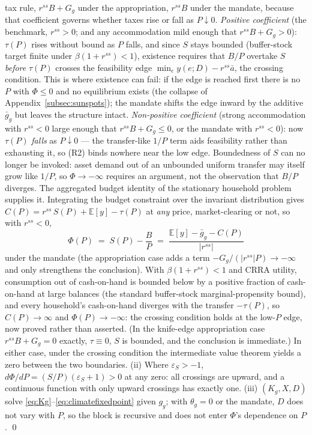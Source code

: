 \documentclass[12pt]{article}
\newcommand{\E}{\mathbb{E}}
\newcommand{\Sfun}{S}
\begin{document}
tax rule, $r^{ss}B+G_g$ under the appropriation, $r^{ss}B$ under the
mandate, because that coefficient governs whether taxes rise or fall as
$P\downarrow0$. \emph{Positive coefficient} (the benchmark, $r^{ss}>0$; and
any accommodation mild enough that $r^{ss}B+G_g>0$): $\tau(P)$ rises without
bound as $P$ falls, and since $\Sfun$ stays bounded (buffer-stock target
finite under $\beta(1+r^{ss})<1$), existence requires that $B/P$ overtake
$\Sfun$ \emph{before} $\tau(P)$ crosses the feasibility edge
$\min_e y(e;D)-r^{ss}\bar a$, the crossing condition. This is where
existence can fail: if the edge is reached first there is no $P$ with
$\Phi\le0$ and no equilibrium exists (the collapse of
Appendix~\ref{subsec:sunspots}); the mandate shifts the edge inward by the
additive $\bar g_g$ but leaves the structure intact. \emph{Non-positive
coefficient} (strong accommodation with $r^{ss}<0$ large enough that
$r^{ss}B+G_g\le0$, or the mandate with $r^{ss}<0$): now $\tau(P)$
\emph{falls} as $P\downarrow0$ --- the transfer-like $1/P$ term aids
feasibility rather than exhausting it, so (R2) binds nowhere near the low
edge. Boundedness of $\Sfun$ can no longer be invoked: asset demand out of
an unbounded uniform transfer may itself grow like $1/P$, so
$\Phi\to-\infty$ requires an argument, not the observation that $B/P$
diverges. The aggregated budget identity of the stationary household
problem supplies it. Integrating the budget constraint over the invariant
distribution gives $C(P) = r^{ss}\,\Sfun(P) + \E[y] - \tau(P)$ at
\emph{any} price, market-clearing or not, so with $r^{ss}<0$,
\[
\Phi(P) \;=\; \Sfun(P) - \frac{B}{P}
\;=\; \frac{\E[y] - \bar g_g - C(P)}{|r^{ss}|}
\]
under the mandate (the appropriation case adds a term
$-G_g/(|r^{ss}|P)\to-\infty$ and only strengthens the conclusion). With
$\beta(1+r^{ss})<1$ and CRRA utility, consumption out of cash-on-hand is
bounded below by a positive fraction of cash-on-hand at large balances
(the standard buffer-stock marginal-propensity bound), and every
household's cash-on-hand diverges with the transfer $-\tau(P)$, so
$C(P)\to\infty$ and $\Phi(P)\to-\infty$: the crossing condition holds
at the low-$P$ edge, now proved rather than asserted. (In the knife-edge
appropriation case $r^{ss}B+G_g=0$ exactly, $\tau\equiv0$, $\Sfun$ is
bounded, and the conclusion is immediate.) In either case, under the crossing
condition the intermediate value theorem yields a zero between the two
boundaries. (ii) Where $\varepsilon_S>-1$,
$d\Phi/dP=(\Sfun/P)(\varepsilon_S+1)>0$ at any zero: all crossings are upward,
and a continuous function with only upward crossings has exactly one.
(iii) $(K_g,X,D)$ solve \eqref{eq:Kg}--\eqref{eq:climatefixedpoint} given
$g_g$; with $\theta_g=0$ or the mandate, $D$ does not vary with $P$, so the
block is recursive and does not enter $\Phi$'s dependence on $P$. \qed
\end{document}
